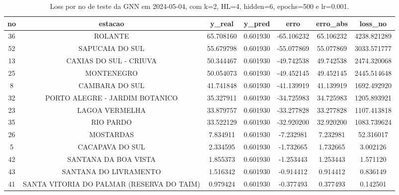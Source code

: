 \begin{table}[h]
\centering
\caption{Loss por no de teste da GNN em 2024-05-04, com k=2, HL=4, hidden=6, epochs=500 e lr=0.001.}
\label{tab:gnn_loss_k2_hl4_h6_e500_d20240504}
\begin{tabular}{ccccccc}
\toprule
no & estacao & y\_real & y\_pred & erro & erro\_abs & loss\_no \\
\midrule
36 & ROLANTE & 65.708160 & 0.601930 & -65.106232 & 65.106232 & 4238.821289 \\
52 & SAPUCAIA DO SUL & 55.679798 & 0.601930 & -55.077869 & 55.077869 & 3033.571777 \\
13 & CAXIAS DO SUL - CRIUVA & 50.344467 & 0.601930 & -49.742538 & 49.742538 & 2474.320068 \\
25 & MONTENEGRO & 50.054073 & 0.601930 & -49.452145 & 49.452145 & 2445.514648 \\
8 & CAMBARA DO SUL & 41.741848 & 0.601930 & -41.139919 & 41.139919 & 1692.492920 \\
32 & PORTO ALEGRE - JARDIM BOTANICO & 35.327911 & 0.601930 & -34.725983 & 34.725983 & 1205.893921 \\
23 & LAGOA VERMELHA & 33.879757 & 0.601930 & -33.277828 & 33.277828 & 1107.413818 \\
35 & RIO PARDO & 33.522129 & 0.601930 & -32.920200 & 32.920200 & 1083.739624 \\
26 & MOSTARDAS & 7.834911 & 0.601930 & -7.232981 & 7.232981 & 52.316017 \\
5 & CACAPAVA DO SUL & 2.334595 & 0.601930 & -1.732665 & 1.732665 & 3.002126 \\
42 & SANTANA DA BOA VISTA & 1.855373 & 0.601930 & -1.253443 & 1.253443 & 1.571120 \\
43 & SANTANA DO LIVRAMENTO & 1.516342 & 0.601930 & -0.914412 & 0.914412 & 0.836149 \\
41 & SANTA VITORIA DO PALMAR (RESERVA DO TAIM) & 0.979424 & 0.601930 & -0.377493 & 0.377493 & 0.142501 \\
\bottomrule
\end{tabular}
\end{table}

